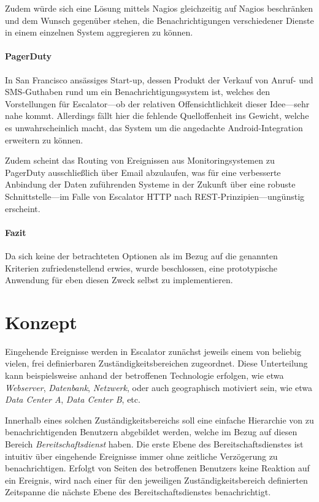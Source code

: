 \documentclass[11pt,utf8,notoc,bibnum,german,final]{zihpub}
\begin{document}
Zudem würde sich eine Lösung mittels Nagios gleichzeitig auf Nagios beschränken
und dem Wunsch gegenüber stehen, die Benachrichtigungen verschiedener Dienste
in einem einzelnen System aggregieren zu können.

\paragraph{PagerDuty~\cite{pagerduty}}

In San Francisco ansässiges Start-up, dessen Produkt der Verkauf von Anruf- und
SMS-Guthaben rund um ein Benachrichtigungssystem ist, welches den Vorstellungen
für Escalator—ob der relativen Offensichtlichkeit dieser Idee—sehr nahe kommt.
Allerdings fällt hier die fehlende Quelloffenheit ins Gewicht, welche es
unwahrscheinlich macht, das System um die angedachte Android-Integration
erweitern zu können.

Zudem scheint das Routing von Ereignissen aus Monitoringsystemen zu PagerDuty
ausschließlich über Email abzulaufen, was für eine verbesserte Anbindung der
Daten zuführenden Systeme in der Zukunft über eine robuste Schnittstelle—im
Falle von Escalator HTTP nach REST-Prinzipien—ungünstig erscheint.

\paragraph{Fazit}

Da sich keine der betrachteten Optionen als im Bezug auf die genannten
Kriterien zufriedenstellend erwies, wurde beschlossen, eine prototypische
Anwendung für eben diesen Zweck selbst zu implementieren.

\section{Konzept}
\label{concept}

Eingehende Ereignisse werden in Escalator zunächst jeweils einem von
beliebig vielen, frei definierbaren Zuständigkeitsbereichen zugeordnet. Diese
Unterteilung kann beispielsweise anhand der betroffenen Technologie erfolgen,
wie etwa \emph{Webserver}, \emph{Datenbank}, \emph{Netzwerk}, oder auch
geographisch motiviert sein, wie etwa \emph{Data Center A}, \emph{Data Center
B}, etc.

Innerhalb eines solchen Zuständigkeitsbereichs soll eine einfache Hierarchie
von zu benachrichtigenden Benutzern abgebildet werden, welche im Bezug auf
diesen Bereich \emph{Bereitschaftsdienst} haben. Die erste Ebene des
Bereitschaftsdienstes ist intuitiv über eingehende Ereignisse immer ohne
zeitliche Verzögerung zu benachrichtigen. Erfolgt von Seiten des betroffenen
Benutzers keine Reaktion auf ein Ereignis, wird nach einer für den jeweiligen
Zuständigkeitsbereich definierten Zeitspanne die nächste Ebene des
Bereitschaftsdienstes benachrichtigt.
\end{document}
